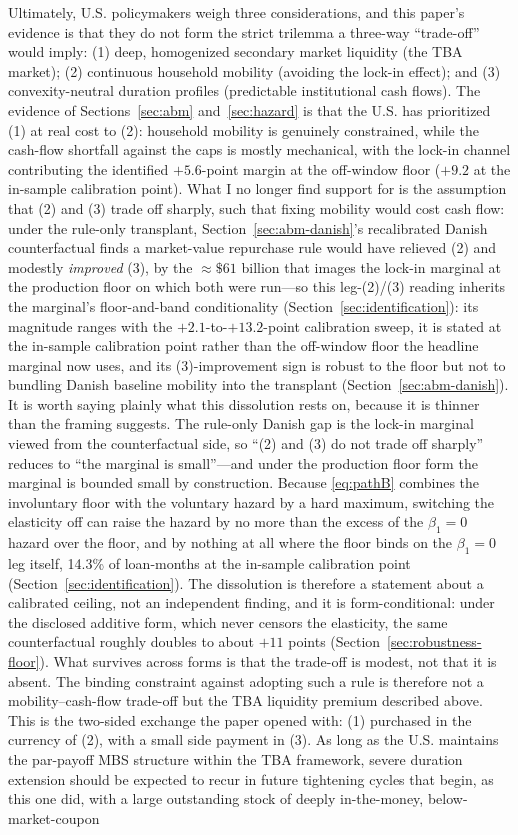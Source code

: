 \documentclass[12pt]{article}
\begin{document}
Ultimately, U.S. policymakers weigh three considerations, and this paper's evidence is that they do not form the strict trilemma a three-way ``trade-off'' would imply: (1) deep, homogenized secondary market liquidity (the TBA market); (2) continuous household mobility (avoiding the lock-in effect); and (3) convexity-neutral duration profiles (predictable institutional cash flows). The evidence of Sections~\ref{sec:abm} and~\ref{sec:hazard} is that the U.S. has prioritized (1) at real cost to (2): household mobility is genuinely constrained, while the cash-flow shortfall against the caps is mostly mechanical, with the lock-in channel contributing the identified $+5.6$-point margin at the off-window floor ($+9.2$ at the in-sample calibration point). What I no longer find support for is the assumption that (2) and (3) trade off sharply, such that fixing mobility would cost cash flow: under the rule-only transplant, Section~\ref{sec:abm-danish}'s recalibrated Danish counterfactual finds a market-value repurchase rule would have relieved (2) and modestly \emph{improved} (3), by the $\approx\$61$ billion that images the lock-in marginal at the production floor on which both were run---so this leg-(2)/(3) reading inherits the marginal's floor-and-band conditionality (Section~\ref{sec:identification}): its magnitude ranges with the $+2.1$-to-$+13.2$-point calibration sweep, it is stated at the in-sample calibration point rather than the off-window floor the headline marginal now uses, and its (3)-improvement sign is robust to the floor but not to bundling Danish baseline mobility into the transplant (Section~\ref{sec:abm-danish}). It is worth saying plainly what this dissolution rests on, because it is thinner than the framing suggests. The rule-only Danish gap is the lock-in marginal viewed from the counterfactual side, so ``(2) and (3) do not trade off sharply'' reduces to ``the marginal is small''---and under the production floor form the marginal is bounded small by construction. Because \eqref{eq:pathB} combines the involuntary floor with the voluntary hazard by a hard maximum, switching the elasticity off can raise the hazard by no more than the excess of the $\beta_1 = 0$ hazard over the floor, and by nothing at all where the floor binds on the $\beta_1 = 0$ leg itself, 14.3\% of loan-months at the in-sample calibration point (Section~\ref{sec:identification}). The dissolution is therefore a statement about a calibrated ceiling, not an independent finding, and it is form-conditional: under the disclosed additive form, which never censors the elasticity, the same counterfactual roughly doubles to about $+11$ points (Section~\ref{sec:robustness-floor}). What survives across forms is that the trade-off is modest, not that it is absent. The binding constraint against adopting such a rule is therefore not a mobility--cash-flow trade-off but the TBA liquidity premium described above. This is the two-sided exchange the paper opened with: (1) purchased in the currency of (2), with a small side payment in (3). As long as the U.S. maintains the par-payoff MBS structure within the TBA framework, severe duration extension should be expected to recur in future tightening cycles that begin, as this one did, with a large outstanding stock of deeply in-the-money, below-market-coupon 
\end{document}
